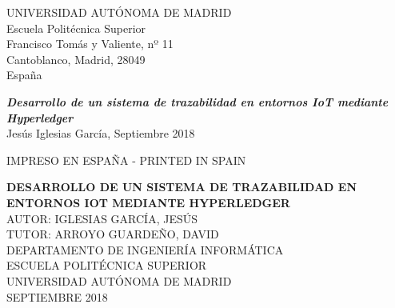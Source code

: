 \documentclass[12pt,a4paper, twoside]{report}
\newcommand{\university}{UNIVERSIDAD AUTÓNOMA DE MADRID}
\newcommand{\faculty}{ESCUELA POLITÉCNICA SUPERIOR}
\newcommand{\dpto}{DEPARTAMENTO DE INGENIERÍA INFORMÁTICA}
\newcommand{\titleTFM}{DESARROLLO DE UN SISTEMA DE TRAZABILIDAD EN ENTORNOS IOT MEDIANTE HYPERLEDGER}
\newcommand{\jesus}{IGLESIAS GARCÍA, JESÚS}
\newcommand{\david}{ARROYO GUARDEÑO, DAVID}
\newcommand{\blankpage}{
				\newpage
				\thispagestyle{empty}
				\mbox{}
				\newpage
				}
\begin{document}
	\begin{flushleft}
		\university \\
		Escuela Politécnica Superior \\
		Francisco Tomás y Valiente, nº 11 \\
		Cantoblanco, Madrid, 28049 \\
		España
		
		\vspace{5mm}	
		
		\textbf{\textit{Desarrollo de un sistema de trazabilidad en entornos IoT mediante Hyperledger}} \\
		Jesús Iglesias García, Septiembre 2018
	
		\vspace{5mm}
	
		IMPRESO EN ESPAÑA - PRINTED IN SPAIN
	\end{flushleft}

	\begin{titlepage}
		\begin{center}
			\vspace*{1.5in}	
			
			\large{\textbf{\titleTFM}} \\
			\vspace*{0.8in}
			\normalsize{AUTOR:} \normalsize{\jesus}  \\
			\vspace*{0.05in}
			\normalsize{TUTOR:} \normalsize{\david} \\
			\vspace*{0.8in}
			\small{\textsc{\dpto}}\\
			\vspace*{0.02in}
			\small{\textsc{\faculty}}\\
			\vspace*{0.02in}
			\small{\textsc{\university}}\\	
			\vspace*{0.02in}
			\small{SEPTIEMBRE 2018} \\
		\end{center}
	\end{titlepage}
	
	\blankpage
	
\end{document}
